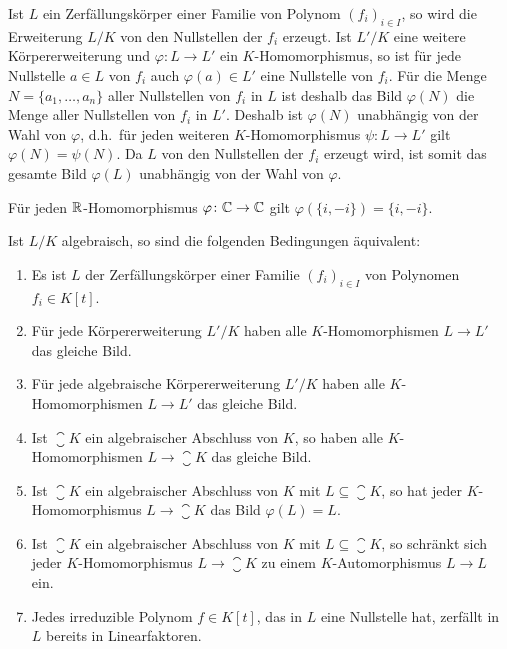 Ist $L$ ein Zerfällungskörper einer Familie von Polynom $(f_i)_{i \in I}$, so wird die Erweiterung $L/K$ von den Nullstellen der $f_i$ erzeugt.
Ist $L'/K$ eine weitere Körpererweiterung und $\varphi \colon L \to L'$ ein $K$-Homomorphismus, so ist für jede Nullstelle $a \in L$ von $f_i$ auch $\varphi(a) \in L'$ eine Nullstelle von $f_i$.
Für die Menge $N = \{ a_1, \dotsc, a_n \}$ aller Nullstellen von $f_i$ in $L$ ist deshalb das Bild $\varphi(N)$ die Menge aller Nullstellen von $f_i$ in $L'$.
Deshalb ist $\varphi(N)$ unabhängig von der Wahl von $\varphi$, d.h.\ für jeden weiteren $K$-Homomorphismus $\psi \colon L \to L'$ gilt $\varphi(N) = \psi(N)$.
Da $L$ von den Nullstellen der $f_i$ erzeugt wird, ist somit das gesamte Bild $\varphi(L)$ unabhängig von der Wahl von $\varphi$.

\begin{example}
  Für jeden $\mathbb{R}$-Homomorphismus $\varphi \colon \mathbb{C} \to \mathbb{C}$ gilt $\varphi(\{i, -i\}) = \{i, -i\}$.
\end{example}

\begin{proposition}
  Ist $L/K$ algebraisch, so sind die folgenden Bedingungen äquivalent:
  \begin{enumerate}
    \item
      Es ist $L$ der Zerfällungskörper einer Familie $(f_i)_{i \in I}$ von Polynomen $f_i \in K[t]$.
    \item
      Für jede Körpererweiterung $L'/K$ haben alle $K$-Homomorphismen $L \to L'$ das gleiche Bild.
    \item
      Für jede algebraische Körpererweiterung $L'/K$ haben alle $K$-Homomorphismen $L \to L'$ das gleiche Bild.
    \item
      Ist $\closure{K}$ ein algebraischer Abschluss von $K$, so haben alle $K$-Homomorphismen $L \to \closure{K}$ das gleiche Bild.
    \item
      Ist $\closure{K}$ ein algebraischer Abschluss von $K$ mit $L \subseteq \closure{K}$, so hat jeder $K$-Homo\-mor\-phis\-mus $L \to \closure{K}$ das Bild $\varphi(L) = L$.
    \item
      Ist $\closure{K}$ ein algebraischer Abschluss von $K$ mit $L \subseteq \closure{K}$, so schränkt sich jeder $K$-Homomorphismus $L \to \closure{K}$ zu einem $K$-Automorphismus $L \to L$ ein.
    \item
      Jedes irreduzible Polynom $f \in K[t]$, das in $L$ eine Nullstelle hat, zerfällt in $L$ bereits in Linearfaktoren.
  \end{enumerate}
\end{proposition}

